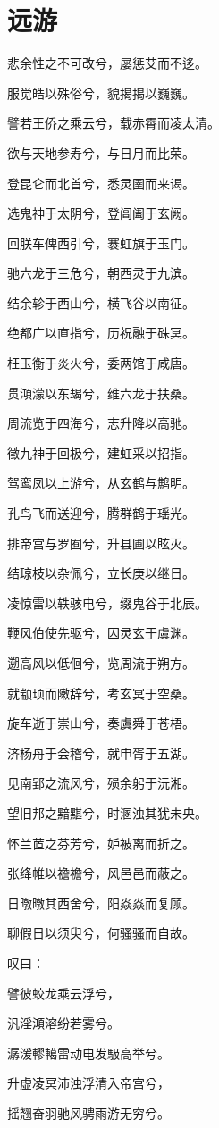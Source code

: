 \documentclass[UTF8,titlepage,oneside]{ctexbook}
\begin{document}
\section*{远游}
\begin{center}
	
	悲余性之不可改兮，屡惩艾而不迻。
	
	服觉皓以殊俗兮，貌揭揭以巍巍。
	
	譬若王侨之乘云兮，载赤霄而凌太清。
	
	欲与天地参寿兮，与日月而比荣。
	
	登昆仑而北首兮，悉灵圉而来谒。
	
	选鬼神于太阴兮，登阊阖于玄阙。
	
	回朕车俾西引兮，褰虹旗于玉门。
	
	驰六龙于三危兮，朝西灵于九滨。
	
	结余轸于西山兮，横飞谷以南征。
	
	绝都广以直指兮，历祝融于硃冥。
	
	枉玉衡于炎火兮，委两馆于咸唐。
	
	贯澒濛以东朅兮，维六龙于扶桑。
	
	周流览于四海兮，志升降以高驰。
	
	徵九神于回极兮，建虹采以招指。
	
	驾鸾凤以上游兮，从玄鹤与鹪明。
	
	孔鸟飞而送迎兮，腾群鹤于瑶光。
	
	排帝宫与罗囿兮，升县圃以眩灭。
	
	结琼枝以杂佩兮，立长庚以继日。
	
	凌惊雷以轶骇电兮，缀鬼谷于北辰。
	
	鞭风伯使先驱兮，囚灵玄于虞渊。
	
	遡高风以低佪兮，览周流于朔方。
	
	就颛顼而敶辞兮，考玄冥于空桑。
	
	旋车逝于崇山兮，奏虞舜于苍梧。
	
	济杨舟于会稽兮，就申胥于五湖。
	
	见南郢之流风兮，殒余躬于沅湘。
	
	望旧邦之黯黮兮，时溷浊其犹未央。
	
	怀兰茝之芬芳兮，妒被离而折之。
	
	张绛帷以襜襜兮，风邑邑而蔽之。
	
	日暾暾其西舍兮，阳焱焱而复顾。
	
	聊假日以须臾兮，何骚骚而自故。
	
	叹曰：
	
	譬彼蛟龙乘云浮兮，
	
	汎淫澒溶纷若雾兮。
	
	潺湲轇轕雷动电发馺高举兮。
	
	升虚凌冥沛浊浮清入帝宫兮，
	
	摇翘奋羽驰风骋雨游无穷兮。
	
\end{center}
	
\end{document}

